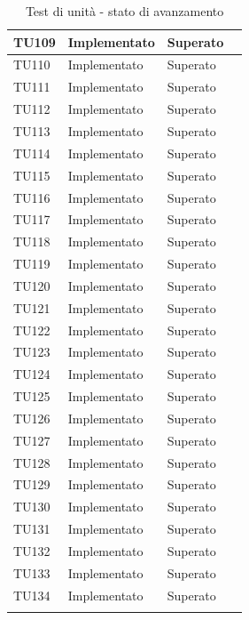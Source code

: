 \begin{longtable}{|>{\centering\arraybackslash}m{1.6cm}|>{\centering\arraybackslash}m{6.41cm}|>{\centering\arraybackslash}m{3.1cm}| c |}
		\rowcolor{LightGray}
	TU109 & Implementato & Superato  \\ \hline
	TU110 & Implementato & Superato  \\ \hline
		\rowcolor{LightGray}
	TU111 & Implementato & Superato  \\ \hline
	TU112 & Implementato & Superato  \\ \hline
		\rowcolor{LightGray}
	TU113 & Implementato & Superato  \\ \hline
	TU114 & Implementato & Superato  \\ \hline
		\rowcolor{LightGray}
	TU115 & Implementato & Superato  \\ \hline
	TU116 & Implementato & Superato  \\ \hline
		\rowcolor{LightGray}
	TU117 & Implementato & Superato  \\ \hline
	TU118 & Implementato & Superato  \\ \hline
		\rowcolor{LightGray}
	TU119 & Implementato & Superato  \\ \hline
	TU120 & Implementato & Superato  \\ \hline
		\rowcolor{LightGray}
	TU121 & Implementato & Superato  \\ \hline
	TU122 & Implementato & Superato  \\ \hline
		\rowcolor{LightGray}
	TU123 & Implementato & Superato  \\ \hline
	TU124 & Implementato & Superato  \\ \hline
		\rowcolor{LightGray}
	TU125 & Implementato & Superato  \\ \hline
	TU126 & Implementato & Superato  \\ \hline
		\rowcolor{LightGray}
	TU127 & Implementato & Superato  \\ \hline
	TU128 & Implementato & Superato  \\ \hline
		\rowcolor{LightGray}
	TU129 & Implementato & Superato  \\ \hline
	TU130 & Implementato & Superato  \\ \hline
		\rowcolor{LightGray}
	TU131 & Implementato & Superato  \\ \hline
	TU132 & Implementato & Superato  \\ \hline
		\rowcolor{LightGray}
	TU133 & Implementato & Superato  \\ \hline
	TU134 & Implementato & Superato  \\ \hline
	\caption{Test di unità - stato di avanzamento}
\end{longtable}

